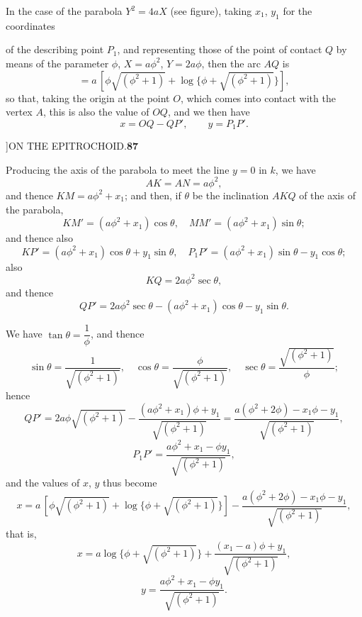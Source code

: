 \documentclass[11pt]{article}
\begin{document}
\hspace{1em} In the case of the parabola $Y^{2}=4aX$ (see figure), taking
$x_{1}$, $y_{1}$ for the coordinates

\begin{center}
\end{center}

\noindent of the describing point $P_{1}$, and representing those of the point
of contact $Q$ by means of the parameter $\phi$, $X=a\phi^{2}$, $Y=2a\phi$,
then the arc $AQ$ is
\[
=a\,[\phi\sqrt{(\phi^{2}+1)}+\log\{\phi+\sqrt{(\phi^{2}+1)}\}],
\]
so that, taking the origin at the point $O$, which comes into contact with the
vertex $A$, this is also the value of $OQ$, and we then have
\[
x=OQ-QP',\qquad y=P_{1}P'.
\]

\newpage
{}]\hfill ON THE EPITROCHOID.\hfill\textbf{87}

\smallskip
Producing the axis of the parabola to meet the line $y=0$ in $k$, we have
\[
AK=AN=a\phi^{2},
\]
and thence $KM=a\phi^{2}+x_{1}$; and then, if $\theta$ be the inclination
$AKQ$ of the axis of the parabola,
\[
KM'=(a\phi^{2}+x_{1})\cos\theta,\quad MM'=(a\phi^{2}+x_{1})\sin\theta;
\]
and thence also
\[
KP'=(a\phi^{2}+x_{1})\cos\theta+y_{1}\sin\theta,\quad
P_{1}P'=(a\phi^{2}+x_{1})\sin\theta-y_{1}\cos\theta;
\]
also
\[
KQ=2a\phi^{2}\sec\theta,
\]
and thence
\[
QP'=2a\phi^{2}\sec\theta-(a\phi^{2}+x_{1})\cos\theta-y_{1}\sin\theta.
\]

\hspace{1em} We have $\tan\theta=\dfrac{1}{\phi}$, and thence
\[
\sin\theta=\frac{1}{\sqrt{(\phi^{2}+1)}},\quad
\cos\theta=\frac{\phi}{\sqrt{(\phi^{2}+1)}},\quad
\sec\theta=\frac{\sqrt{(\phi^{2}+1)}}{\phi};
\]
hence
\[
QP'=2a\phi\sqrt{(\phi^{2}+1)}-\frac{(a\phi^{2}+x_{1})\phi+y_{1}}{\sqrt{(\phi^{2}+1)}}
=\frac{a(\phi^{2}+2\phi)-x_{1}\phi-y_{1}}{\sqrt{(\phi^{2}+1)}},
\]
\[
P_{1}P'=\frac{a\phi^{2}+x_{1}-\phi y_{1}}{\sqrt{(\phi^{2}+1)}},
\]
and the values of $x$, $y$ thus become
\[
x=a\,[\phi\sqrt{(\phi^{2}+1)}+\log\{\phi+\sqrt{(\phi^{2}+1)}\}]-\frac{a(\phi^{2}+2\phi)-x_{1}\phi-y_{1}}{\sqrt{(\phi^{2}+1)}},
\]
that is,
\[
x=a\log\{\phi+\sqrt{(\phi^{2}+1)}\}+\frac{(x_{1}-a)\phi+y_{1}}{\sqrt{(\phi^{2}+1)}},
\]
\[
y=\frac{a\phi^{2}+x_{1}-\phi y_{1}}{\sqrt{(\phi^{2}+1)}}.
\]
\end{document}
